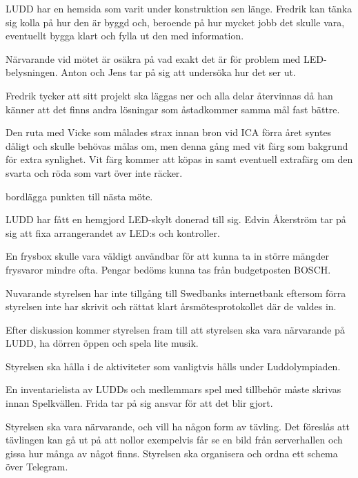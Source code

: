 \documentclass{protokoll}
\begin{document}
LUDD har en hemsida som varit under konstruktion sen länge. Fredrik kan tänka sig kolla på hur den är byggd och, beroende på hur mycket jobb det skulle vara, eventuellt bygga klart och fylla ut den med information.

Närvarande vid mötet är osäkra på vad exakt det är för problem med LED-belysningen. 
Anton och Jens tar på sig att undersöka hur det ser ut. 


Fredrik tycker att sitt projekt ska läggas ner och alla delar återvinnas då han känner att det finns andra lösningar som åstadkommer samma mål fast bättre.

Den ruta med Vicke som målades strax innan bron vid ICA förra året syntes dåligt och skulle behövas målas om, men denna gång med vit färg som bakgrund för extra synlighet. 
Vit färg kommer att köpas in samt eventuell extrafärg om den svarta och röda som vart över inte räcker. 

\begin{beslut}
    \att bordlägga punkten till nästa möte.
\end{beslut}

LUDD har fått en hemgjord LED-skylt donerad till sig.  
Edvin Åkerström tar på sig att fixa arrangerandet av LED:s och kontroller.

En frysbox skulle vara väldigt användbar för att kunna ta in större mängder frysvaror mindre ofta. Pengar bedöms kunna tas från budgetposten BOSCH. 

Nuvarande styrelsen har inte tillgång till Swedbanks internetbank eftersom förra styrelsen inte har skrivit och rättat klart årsmötesprotokollet där de valdes in.

Efter diskussion kommer styrelsen fram till att styrelsen ska vara närvarande på LUDD, ha dörren öppen och spela lite musik.

Styrelsen ska hålla i de aktiviteter som vanligtvis hålls under Luddolympiaden. 

En inventarielista av LUDDs och medlemmars spel med tillbehör måste skrivas innan Spelkvällen.
Frida tar på sig ansvar för att det blir gjort. 

Styrelsen ska vara närvarande, och vill ha någon form av tävling. Det föreslås att tävlingen kan gå ut på att nollor exempelvis får se en bild från serverhallen och gissa hur många av något finns. 
Styrelsen ska organisera och ordna ett schema över Telegram. 
\end{document}

